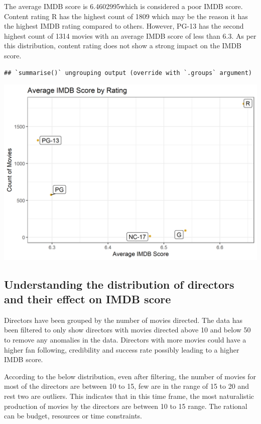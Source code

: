 \documentclass[
]{article}
\begin{document}
The average IMDB score is 6.4602995which is considered a poor IMDB
score. Content rating R has the highest count of 1809 which may be the
reason it has the highest IMDB rating compared to others. However, PG-13
has the second highest count of 1314 movies with an average IMDB score
of less than 6.3. As per this distribution, content rating does not show
a strong impact on the IMDB score.

\begin{verbatim}
## `summarise()` ungrouping output (override with `.groups` argument)
\end{verbatim}

\includegraphics[width=0.75\linewidth]{IMDB_files/figure-latex/content_rating chart-1}

\hypertarget{understanding-the-distribution-of-directors-and-their-effect-on-imdb-score}{%
\subsection{Understanding the distribution of directors and their effect
on IMDB
score}\label{understanding-the-distribution-of-directors-and-their-effect-on-imdb-score}}

Directors have been grouped by the number of movies directed. The data
has been filtered to only show directors with movies directed above 10
and below 50 to remove any anomalies in the data. Directors with more
movies could have a higher fan following, credibility and success rate
possibly leading to a higher IMDB score.

According to the below distribution, even after filtering, the number of
movies for most of the directors are between 10 to 15, few are in the
range of 15 to 20 and rest two are outliers. This indicates that in this
time frame, the most naturalistic production of movies by the directors
are between 10 to 15 range. The rational can be budget, resources or
time constraints.
\end{document}
